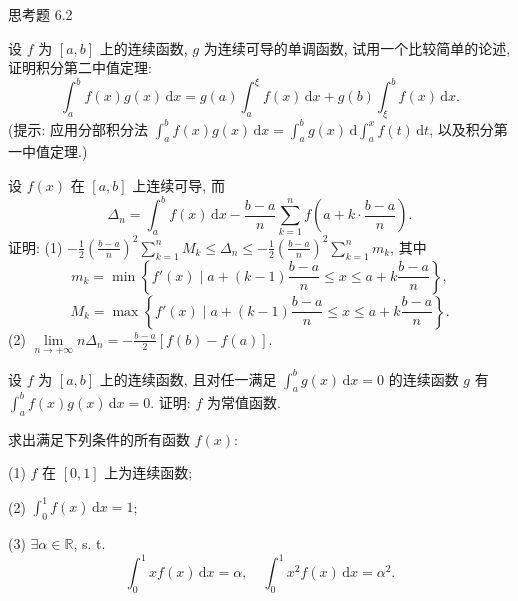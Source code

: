 \begin{exblock}{思考题 6.2}
  \item 设 $f$ 为 $[a,b]$ 上的连续函数, $g$ 为连续可导的单调函数, 试用一个比较简单的论述, 证明积分第二中值定理:
  \[
  \int_{a}^{b}f(x)g(x)\,\mathrm{d}x=g(a)\int_{a}^{\xi}f(x)\,\mathrm{d}x+g(b)\int_{\xi}^{b}f(x)\,\mathrm{d}x.
\]
  (提示: 应用分部积分法 $\int_{a}^{b}f(x)g(x)\,\mathrm{d}x=\int_{a}^{b}g(x)\,\mathrm{d}\int_{a}^{x}f(t)\,\mathrm{d}t$, 以及积分第一中值定理.)

  \item 设 $f(x)$ 在 $[a,b]$ 上连续可导, 而
  \[
  \Delta_{n}=\int_{a}^{b}f(x)\,\mathrm{d}x-\frac{b-a}{n}\sum_{k=1}^{n}f\left(a+k\cdot\frac{b-a}{n}\right).
\]
  证明: (1) $-\frac{1}{2}\left(\frac{b-a}{n}\right)^{2}\sum\limits_{k=1}^{n}M_{k}\leqslant\Delta_{n}\leqslant-\frac{1}{2}\left(\frac{b-a}{n}\right)^{2}\sum\limits_{k=1}^{n}m_{k}$, 其中
  \[
  m_{k}=\min\left\{f'(x)\mid a+(k-1)\frac{b-a}{n}\leqslant x\leqslant a+k\frac{b-a}{n}\right\},
\]
  \[
  M_{k}=\max\left\{f'(x)\mid a+(k-1)\frac{b-a}{n}\leqslant x\leqslant a+k\frac{b-a}{n}\right\}.
\]
  (2) $\lim\limits_{n\to+\infty}n\Delta_{n}=-\frac{b-a}{2}[f(b)-f(a)]$.

  \item 设 $f$ 为 $[a,b]$ 上的连续函数, 且对任一满足 $\int_{a}^{b}g(x)\,\mathrm{d}x=0$ 的连续函数 $g$ 有\linebreak[4]$\int_{a}^{b}f(x)g(x)\,\mathrm{d}x=0$. 证明: $f$ 为常值函数.

  \item 求出满足下列条件的所有函数 $f(x)$:

  (1) $f$ 在 $[0,1]$ 上为连续函数;

  (2) $\int_{0}^{1}f(x)\,\mathrm{d}x=1$;

  (3) $\exists\alpha\in\mathbb{R}$, s. t.
  \[
  \int_{0}^{1}xf(x)\,\mathrm{d}x=\alpha,\quad\int_{0}^{1}x^{2}f(x)\,\mathrm{d}x=\alpha^{2}.
\]
\end{exblock}
